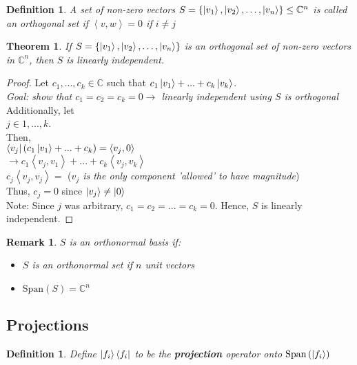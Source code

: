 \documentclass[12pt]{article}
\theoremstyle{plain}
\newtheorem{theorem}[lemma]{Theorem}
\theoremstyle{nonumberplain}
\theoremstyle{plain}
\newtheorem{definition}[lemma]{Definition}
\newtheorem{remark}[lemma]{Remark}
\theoremstyle{nonumberplain}
\newtheorem{proof}{Proof.}
\newcommand\1{{\bf 1}}
\newcommand{\C}{\mathbb{C}} %
\newcommand{\<}{\left\langle}
\renewcommand{\>}{\right\rangle}
\newcommand{\lp}{\left(}
\newcommand{\rp}{\right)}
\newcommand{\lb}{\left\{}
\newcommand{\rb}{\right\}}
\newcommand{\inp}[2]{\left\langle#1, #2\right\rangle} %
\newcommand{\spn}[1]{\text{Span}\lp #1\rp} %
\newcommand{\setofkets}[1]{\lb \ket{#1_1}, \ket{#1_2}, \ldots, \ket{#1_n}\rb} %
\begin{document}
\begin{definition}
A set of non-zero vectors $S=\setofkets{v}\leq\C^n$ is called an orthogonal set if $\inp{v}{w}=0$ if $i\neq j$
\end{definition}
\begin{theorem}
If $S=\setofkets{v}$ is an orthogonal set of non-zero vectors in $\C^n$, then $S$ is linearly independent.
\end{theorem}
\begin{proof}
Let $c_1, ..., c_k\in\C$ such that $c_1\ket{v_1}+...+c_k\ket{v_k}$. \\
\textit{Goal: show that $c_1=c_2=c_k=0\longrightarrow$ linearly independent using $S$ is orthogonal} \\
Additionally, let \\ 
\indent $j\in{1,...,k}$.\\
Then, \\ 
\indent $\bra{v_j}(c_1\ket{v_1}+...+c_k)=\inp{v_j}{0}$ \\
\indent $\longrightarrow c_1\inp{v_j}{v_1}+...+c_k\inp{v_j}{v_k}$ \\
\indent $c_j\inp{v_j}{v_j}=$ (\textit{$v_j$ is the only component 'allowed' to have magnitude}) \\
Thus, $c_j=0$ since $\ket{v_j}\neq\ket{0}$ \\
Note: Since $j$ was arbitrary, $c_1 = c_2 = ... = c_k = 0$. Hence, $S$ is linearly independent.
\end{proof}

\begin{remark}
$S$ is an orthonormal basis if:
\begin{itemize}
	\item $S$ is an orthonormal set if $n$ unit vectors
	\item $\spn{S}=\C^n$
\end{itemize}
\end{remark}


\subsection{Projections}

\begin{definition}
Define $\ket{f_i}\bra{f_i}$ to be the \textbf{projection} operator onto $\spn{\ket{f_i}}$
\end{definition}
\end{document}
